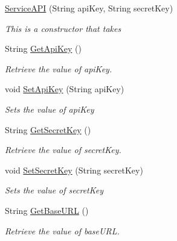 \begin{DoxyCompactItemize}
\item 
\hyperlink{classcom_1_1shephertz_1_1app42_1_1paas_1_1sdk_1_1csharp_1_1_service_a_p_i_a8d0a8129fea9694fb0da8858167c30b3}{Service\+A\+P\+I} (String api\+Key, String secret\+Key)
\begin{DoxyCompactList}\small\item\em This is a constructor that takes \end{DoxyCompactList}\item 
String \hyperlink{classcom_1_1shephertz_1_1app42_1_1paas_1_1sdk_1_1csharp_1_1_service_a_p_i_a8a3f1cc188f765d79f7782754cc1509b}{Get\+Api\+Key} ()
\begin{DoxyCompactList}\small\item\em Retrieve the value of api\+Key. \end{DoxyCompactList}\item 
void \hyperlink{classcom_1_1shephertz_1_1app42_1_1paas_1_1sdk_1_1csharp_1_1_service_a_p_i_af7bbcbe1af10a6e20ae5df7d7fd32b28}{Set\+Api\+Key} (String api\+Key)
\begin{DoxyCompactList}\small\item\em Sets the value of api\+Key \end{DoxyCompactList}\item 
String \hyperlink{classcom_1_1shephertz_1_1app42_1_1paas_1_1sdk_1_1csharp_1_1_service_a_p_i_ab495a88c17a5d1bc09f29e3ab137e2dd}{Get\+Secret\+Key} ()
\begin{DoxyCompactList}\small\item\em Retrieve the value of secret\+Key. \end{DoxyCompactList}\item 
void \hyperlink{classcom_1_1shephertz_1_1app42_1_1paas_1_1sdk_1_1csharp_1_1_service_a_p_i_a61f69e5323491404691f67cd0cfed76e}{Set\+Secret\+Key} (String secret\+Key)
\begin{DoxyCompactList}\small\item\em Sets the value of secret\+Key \end{DoxyCompactList}\item 
String \hyperlink{classcom_1_1shephertz_1_1app42_1_1paas_1_1sdk_1_1csharp_1_1_service_a_p_i_a3ad876436d934ead1104f92f035dd1ee}{Get\+Base\+U\+R\+L} ()
\begin{DoxyCompactList}\small\item\em Retrieve the value of base\+U\+R\+L. \end{DoxyCompactList}\item 

\end{DoxyCompactItemize}
